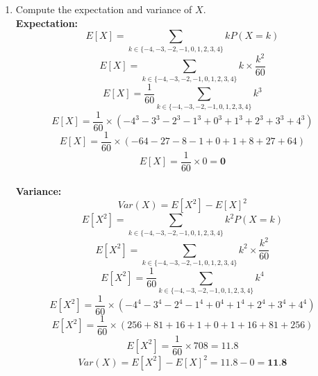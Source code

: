\documentclass[a3paper,12pt]{extarticle} %
\begin{document}
\begin{enumerate}
\begin{enumerate}
        \item Compute the expectation and variance of \(X\).
        \\\textbf{Expectation:}
        \[
            E[X] = \sum_{k \in \{-4, -3, -2, -1, 0, 1, 2, 3, 4\}} kP(X = k)
        \]
        \[
            E[X] = \sum_{k \in \{-4, -3, -2, -1, 0, 1, 2, 3, 4\}} k \times \frac{k^2}{60}
        \]
        \[
            E[X] = \frac{1}{60} \sum_{k \in \{-4, -3, -2, -1, 0, 1, 2, 3, 4\}} k^3
        \]
        \[
            E[X] = \frac{1}{60} \times (-4^3 - 3^3 - 2^3 - 1^3 + 0^3 + 1^3 + 2^3 + 3^3 + 4^3)
        \]
        \[
            E[X] = \frac{1}{60} \times (-64 - 27 - 8 - 1 + 0 + 1 + 8 + 27 + 64)
        \]
        \[
            E[X] = \frac{1}{60} \times 0 = \textbf{0}
        \]
        \\\textbf{Variance:}
        \[
            Var(X) = E[X^2] - E[X]^2
        \]
        \[
            E[X^2] = \sum_{k \in \{-4, -3, -2, -1, 0, 1, 2, 3, 4\}} k^2P(X = k)
        \]
        \[
            E[X^2] = \sum_{k \in \{-4, -3, -2, -1, 0, 1, 2, 3, 4\}} k^2 \times \frac{k^2}{60}
        \]
        \[
            E[X^2] = \frac{1}{60} \sum_{k \in \{-4, -3, -2, -1, 0, 1, 2, 3, 4\}} k^4
        \]
        \[
            E[X^2] = \frac{1}{60} \times (-4^4 - 3^4 - 2^4 - 1^4 + 0^4 + 1^4 + 2^4 + 3^4 + 4^4)
        \]
        \[
            E[X^2] = \frac{1}{60} \times (256 + 81 + 16 + 1 + 0 + 1 + 16 + 81 + 256)
        \]
        \[
            E[X^2] = \frac{1}{60} \times 708 = 11.8
        \]
        \[
            Var(X) = E[X^2] - E[X]^2 = 11.8 - 0 = \textbf{11.8}
        \]


\end{enumerate}
\end{enumerate}
\end{document}
